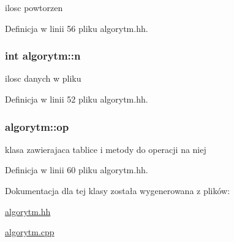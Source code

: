 ilosc powtorzen 



\-Definicja w linii 56 pliku algorytm.\-hh.

\hypertarget{classalgorytm_a2778c37f0ec06a30b7d494501c40e91a}{
\subsubsection[{n}]{\setlength{\rightskip}{0pt plus 5cm}int {\bf algorytm\-::n}}}\label{classalgorytm_a2778c37f0ec06a30b7d494501c40e91a}


ilosc danych w pliku 



\-Definicja w linii 52 pliku algorytm.\-hh.

\hypertarget{classalgorytm_aedaee1aa41206b5f050fe660d0846f2d}{
\subsubsection[{op}]{ {\bf algorytm\-::op}}}\label{classalgorytm_aedaee1aa41206b5f050fe660d0846f2d}


klasa zawierajaca tablice i metody do operacji na niej 



\-Definicja w linii 60 pliku algorytm.\-hh.



\-Dokumentacja dla tej klasy została wygenerowana z plików\-:\begin{DoxyCompactItemize}
\item 
\hyperlink{algorytm_8hh}{algorytm.\-hh}\item 
\hyperlink{algorytm_8cpp}{algorytm.\-cpp}\end{DoxyCompactItemize}
